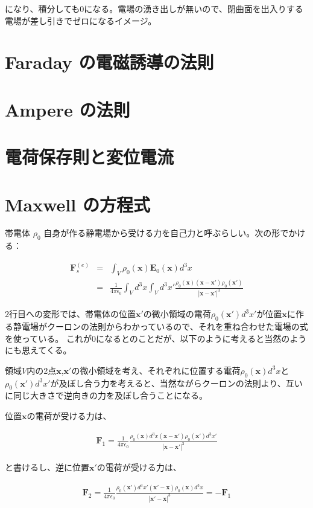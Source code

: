 \documentclass[a4j,12pt,uplatex,dvipdfmx]{jsreport}
\begin{document}
になり、積分しても$0$になる。電場の湧き出しが無いので、閉曲面を出入りする電場が差し引きでゼロになるイメージ。
\section{Faraday の電磁誘導の法則}

\section{Ampere の法則}

\section{電荷保存則と変位電流}

\section{Maxwell の方程式}

帯電体 $\rho_0$ 自身が作る静電場から受ける力を自己力と呼ぶらしい。次の形でかける：

\begin{eqnarray*}
    \bm{F}^{(e)}_{s} &=& \int_{V} \rho_0(\bm{x}) \bm{E}_0(\bm{x}) d^3 x \\
    &=& \frac{1}{4 \pi \epsilon_0} \int_V d^3 x \int_V d^3 x' \frac{\rho_0(\bm{x}) (\bm{x} - \bm{x'}) \rho_0(\bm{x'})}{| \bm{x} - \bm{x'} |^3}
\end{eqnarray*}

2行目への変形では、帯電体の位置$\bm{x'}$の微小領域の電荷$\rho_0(\bm{x'}) d^3 x'$が位置$\bm{x}$に作る静電場がクーロンの法則からわかっているので、それを重ね合わせた電場の式を使っている。
これが$0$になるとのことだが、以下のように考えると当然のようにも思えてくる。

領域$V$内の2点$\bm{x}$,$\bm{x'}$の微小領域を考え、それぞれに位置する電荷$\rho_0(\bm{x})d^3x$と$\rho_0(\bm{x'})d^3x'$が及ぼし合う力を考えると、当然ながらクーロンの法則より、互いに同じ大きさで逆向きの力を及ぼし合うことになる。

位置$\bm{x}$の電荷が受ける力は、

\begin{eqnarray*}
    \bm{F}_1 = \frac{1}{4 \pi \epsilon_0}  \frac{\rho_0(\bm{x})d^3 x (\bm{x} - \bm{x'}) \rho_0(\bm{x'}) d^3 x'}{| \bm{x} - \bm{x'} |^3}
\end{eqnarray*}

と書けるし、逆に位置$\bm{x'}$の電荷が受ける力は、

\begin{eqnarray*}
    \bm{F}_2 = \frac{1}{4 \pi \epsilon_0}  \frac{\rho_0(\bm{x'}) d^3 x' (\bm{x'} - \bm{x}) \rho_0(\bm{x}) d^3 x}{| \bm{x'} - \bm{x} |^3} = - \bm{F}_1
\end{eqnarray*}
\end{document}
